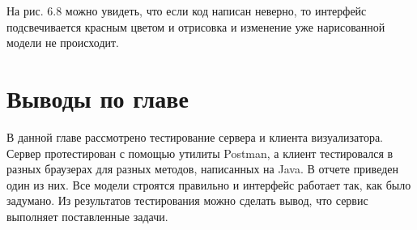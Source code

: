На рис. 6.8 можно увидеть, что если код написан неверно, то интерфейс подсвечивается красным цветом и отрисовка и изменение уже нарисованной модели не происходит.
\section{Выводы по главе} \label{ch6:sec3}
В данной главе рассмотрено тестирование сервера и клиента визуализатора. Сервер протестирован с помощью утилиты Postman, а клиент тестировался в разных браузерах для разных методов, написанных на Java. В отчете приведен один из них. Все модели строятся правильно и интерфейс работает так, как было задумано. Из результатов тестирования можно сделать вывод, что сервис выполняет поставленные задачи.
\newpage